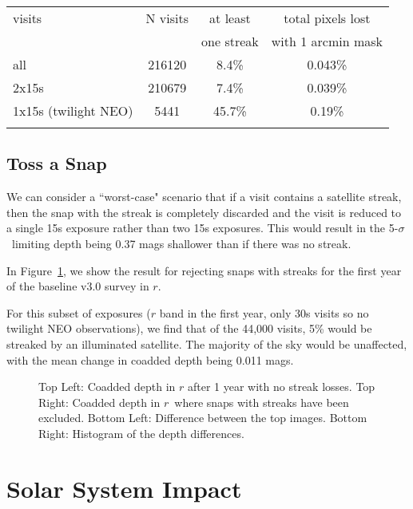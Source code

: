 \begin{table}
\begin{tabular}{ l  c  c c}
  visits & N visits & at least  & total pixels lost \\
  & & one streak & with 1 arcmin mask \\
  \hline			
  all & 216120 & 8.4\%  & 0.043\% \\
  2x15s & 210679 & 7.4\% &  0.039\% \\
  1x15s (twilight NEO)  & 5441 & 45.7\% & 0.19\% \\
  \hline  
  \label{table:pixel}
\end{tabular}
\end{table}


\subsection{Toss a Snap}

We can consider a ``worst-case" scenario that if a visit contains a satellite streak, then the snap with the streak is completely discarded and the visit is reduced to a single 15s exposure rather than two 15s exposures. This would result in the 5-$\sigma$\ limiting depth being 0.37 mags shallower than if there was no streak.

In Figure~\ref{fig:depth_change}, we show the result for rejecting snaps with streaks for the first year of the baseline v3.0 survey in $r$. 

For this subset of exposures ($r$ band in the first year, only 30s visits so no twilight NEO observations), we find that of the 44,000 visits, 5\% would be streaked by an illuminated satellite. The majority of the sky would be unaffected, with the mean change in coadded depth being 0.011 mags. 

\begin{figure}
\caption{ Top Left: Coadded depth in $r$ after 1 year with no streak losses. Top Right: Coadded depth in $r$\ where snaps with streaks have been excluded. Bottom Left: Difference between the top images. Bottom Right: Histogram of the depth differences. \label{fig:depth_change}}
\end{figure}



\section{Solar System Impact}

